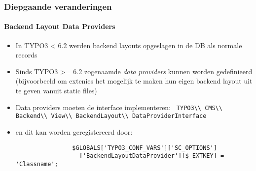 
\begin{frame}[fragile]
	\frametitle{Diepgaande veranderingen}
	\framesubtitle{Backend Layout Data Providers}

	\begin{itemize}
		\item In TYPO3 < 6.2 werden backend layouts opgeslagen in de DB als normale records
		\item Sinds TYPO3 >= 6.2 zogenaamde \emph{data providers} kunnen worden gedefinieerd \newline
			\small(bijvoorbeeld om extenies het mogelijk te maken hun eigen backend layout uit te geven vanuit static files)\normalsize

		\item Data providers moeten de interface implementeren:\newline
			\smaller\texttt{
				TYPO3\textbackslash\textbackslash
				CMS\textbackslash\textbackslash
				Backend\textbackslash\textbackslash
				View\textbackslash\textbackslash
				BackendLayout\textbackslash\textbackslash
				DataProviderInterface}\normalsize

		\item en dit kan worden geregistereerd door:

			\begin{lstlisting}
				$GLOBALS['TYPO3_CONF_VARS']['SC_OPTIONS']
				  ['BackendLayoutDataProvider'][$_EXTKEY] = 'Classname';
			\end{lstlisting}


	\end{itemize}

\end{frame}


